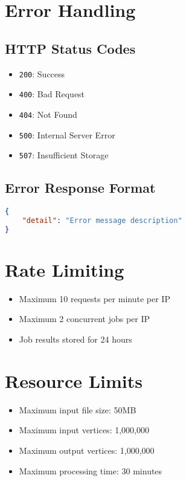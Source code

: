 \section{Error Handling}
\subsection{HTTP Status Codes}
\begin{itemize}
    \item \texttt{200}: Success
    \item \texttt{400}: Bad Request
    \item \texttt{404}: Not Found
    \item \texttt{500}: Internal Server Error
    \item \texttt{507}: Insufficient Storage
\end{itemize}

\subsection{Error Response Format}
\begin{lstlisting}[language=json]
{
    "detail": "Error message description"
}
\end{lstlisting}

\section{Rate Limiting}
\begin{itemize}
    \item Maximum 10 requests per minute per IP
    \item Maximum 2 concurrent jobs per IP
    \item Job results stored for 24 hours
\end{itemize}

\section{Resource Limits}
\begin{itemize}
    \item Maximum input file size: 50MB
    \item Maximum input vertices: 1,000,000
    \item Maximum output vertices: 1,000,000
    \item Maximum processing time: 30 minutes
\end{itemize}
